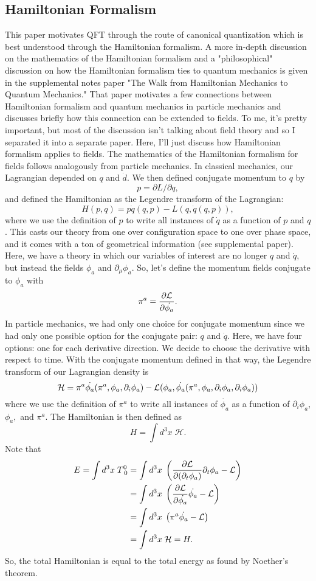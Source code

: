 \subsection{Hamiltonian Formalism}
This paper motivates QFT through the route of canonical quantization which is best understood through the Hamiltonian formalism. A more in-depth discussion on the mathematics of the Hamiltonian formalism and a "philosophical" discussion on how the Hamiltonian formalism ties to quantum mechanics is given in the supplemental notes paper "The Walk from Hamiltonian Mechanics to Quantum Mechanics." That paper motivates a few connections between Hamiltonian formalism and quantum mechanics in particle mechanics and discusses briefly how this connection can be extended to fields. To me, it's pretty important, but most of the discussion isn't talking about field theory and so I separated it into a separate paper. Here, I'll just discuss how Hamiltonian formalism applies to fields. The mathematics of the Hamiltonian formalism for fields follows analogously from particle mechanics. In classical mechanics, our Lagrangian depended on $q$ and $\dot{d}$. We then defined conjugate momentum to $q$ by
\[
    p=\partial L/\partial q,
\]
and defined the Hamiltonian as the Legendre transform of the Lagrangian:
\[
    H(p, q) = p\dot{q}(q, p) - L(q, \dot{q}(q, p)),
\]
where we use the definition of $p$ to write all instances of $\dot{q}$ as a function of $p$ and $q$. This casts our theory from one over configuration space to one over phase space, and it comes with a ton of geometrical information (see supplemental paper). Here, we have a theory in which our variables of interest are no longer $q$ and $\dot{q}$, but instead the fields $\phi_a$ and $\partial_\mu\phi_a$. So, let's define the momentum fields conjugate to $\phi_a$ with
\[
    \pi^a = \frac{\partial\mathcal{L}}{\partial\dot{\phi_a}}.
\]
In particle mechanics, we had only one choice for conjugate momentum since we had only one possible option for the conjugate pair: $q$ and $\dot{q}$. Here, we have four options: one for each derivative direction. We decide to choose the derivative with respect to time. With the conjugate momentum defined in that way, the Legendre transform of our Lagrangian density is
\[
    \mathcal{H} = \pi^a\dot{\phi_a}(\pi^a, \phi_a,\partial_i\phi_a) - \mathcal{L}(\phi_a, \dot{\phi_a}(\pi^a, \phi_a, \partial_i\phi_a, \partial_i\phi_a))
\]
where we use the definition of $\pi^a$ to write all instances of $\dot{\phi_a}$ as a function of $\partial_i\phi_a$, $\phi_a,$ and $\pi^a$. The Hamiltonian is then defined as
\[
    H = \int d^3x\; \mathcal{H}.
\]
Note that
\begin{align*}
    E = \int d^3x\; T^0_{\;0} &= \int d^3x\; \left(\frac{\partial\mathcal{L}}{\partial(\partial_t\phi_a)}\partial_t\phi_a - \mathcal{L}\right) \\
    &=\int d^3x\;\left(\frac{\partial{\mathcal{L}}}{\partial\dot{\phi_a}}\dot{\phi_a} - \mathcal{L}\right)\\
    &= \int d^3x\;\left(\pi^a\dot{\phi_a} - \mathcal{L}\right)\\
    &= \int d^3x\; \mathcal{H} = H.
\end{align*}
So, the total Hamiltonian is equal to the total energy as found by Noether's theorem. \\

